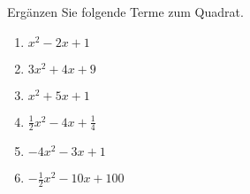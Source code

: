 \documentclass[12pt]{article}
\begin{document}
\begin{exercise}\label{ex:quad_ergaenzung}
Ergänzen Sie folgende Terme zum Quadrat.
\begin{enumerate}[2col, label=\alph*)]
\item $x^2 - 2x + 1$
\item $3x^2 + 4x + 9$
\item $x^2 +5x + 1$
\item $\frac{1}{2}x^2 -4x + \frac{1}{4}$
\item $-4x^2 -3x + 1$
\item $-\frac{1}{2}x^2 - 10x + 100$\\
\end{enumerate}
\end{exercise}
%
%
%
%
\end{document}
